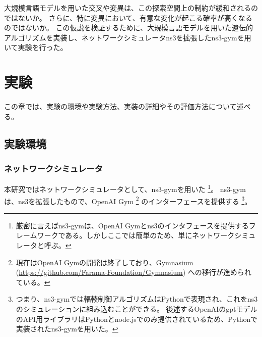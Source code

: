\documentclass[a4paper,11pt]{jreport}
\begin{document}
大規模言語モデルを用いた交叉や変異は、この探索空間上の制約が緩和されるのではないか。
さらに、特に変異において、有意な変化が起こる確率が高くなるのではないか。
この仮説を検証するために、大規模言語モデルを用いた遺伝的アルゴリズムを実装し、ネットワークシミュレータns3\cite{ns3-2012, ns3-2010}を拡張したns3-gym\cite{ns3gym}を用いて実験を行った。

\newpage

\chapter{実験}
\label{chapter:experiment}
この章では、実験の環境や実験方法、実装の詳細やその評価方法について述べる。

\section{実験環境}

\subsection{ネットワークシミュレータ}

本研究ではネットワークシミュレータとして、ns3-gym\cite{ns3gym}を用いた
\footnote{厳密に言えばns3-gymは、OpenAI Gymとns3のインタフェースを提供するフレームワークである。しかしここでは簡単のため、単にネットワークシミュレータと呼ぶ。}。
ns3-gymは、ns3\cite{ns3-2012, ns3-2010}を拡張したもので、OpenAI Gym\cite{gym}
\footnote{現在はOpenAI Gymの開発は終了しており、Gymnasium (\url{https://github.com/Farama-Foundation/Gymnasium}) への移行が進められている。}
のインターフェースを提供する
\footnote{つまり、ns3-gymでは輻輳制御アルゴリズムはPythonで表現され、これをns3のシミュレーションに組み込むことができる。
後述するOpenAIのgptモデルのAPI用ライブラリはPythonとnode.jsでのみ提供されているため、Pythonで実装されたns3-gymを用いた。
}。
\end{document}
